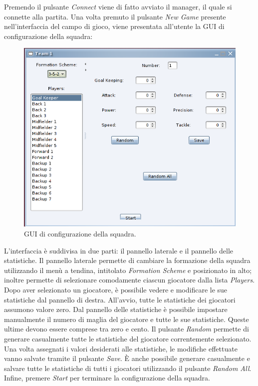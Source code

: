Premendo il pulsante \emph{Connect} viene di fatto avviato il manager, il quale si connette alla partita. Una volta premuto il pulsante \emph{New Game} presente nell'interfaccia del campo di gioco, viene presentata all'utente la GUI di configurazione della squadra:
\begin{figure}[h]
	\centering
	\includegraphics[scale=.5]{images/team_configuration}
	\caption{GUI di configurazione della squadra.}
\end{figure}

L'interfaccia è suddivisa in due parti: il pannello laterale e il pannello delle statistiche. Il pannello laterale permette di cambiare la formazione della squadra utilizzando il menù a tendina, intitolato \emph{Formation Scheme} e posizionato in alto; inoltre permette di selezionare comodamente ciascun giocatore dalla lista \emph{Players}. Dopo aver selezionato un giocatore, è possibile vedere e modificare le sue statistiche dal pannello di destra. All'avvio, tutte le statistiche dei giocatori assumono valore zero. Dal pannello delle statistiche è possibile impostare manualmente il numero di maglia del giocatore e tutte le sue statistiche. Queste ultime devono essere comprese tra zero e cento. Il pulsante \emph{Random} permette di generare casualmente tutte le statistiche del giocatore correntemente selezionato. Una volta assegnati i valori desiderati alle statistiche, le modifiche effettuate vanno salvate tramite il pulsante \emph{Save}. \`{E} anche possibile generare casualmente e salvare tutte le statistiche di tutti i giocatori utilizzando il pulsante \emph{Random All}. Infine, premere \emph{Start} per terminare la configurazione della squadra.\\

